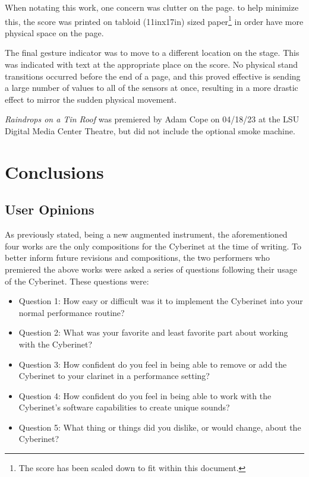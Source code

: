 When notating this work, one concern was clutter on the page. to help minimize this, the score was printed on tabloid (11inx17in) sized paper\footnote{The score has been scaled down to fit within this document.} in order have more physical space on the page. 


The final gesture indicator was to move to a different location on the stage. This was indicated with text at the appropriate place on the score. No physical stand transitions occurred before the end of a page, and this proved effective is sending a large number of values to all of the sensors at once, resulting in a more drastic effect to mirror the sudden physical movement.

\textit{Raindrops on a Tin Roof} was premiered by Adam Cope on 04/18/23 at the LSU Digital Media Center Theatre, but did not include the optional smoke machine.



\chapter{Conclusions} %

\section{User Opinions}

As previously stated, being a new augmented instrument, the aforementioned four works are the only compositions for the Cyberinet at the time of writing. To better inform future revisions and compositions, the two performers who premiered the above works were asked a series of questions following their usage of the Cyberinet. These questions were:

\begin{itemize}
    \item Question 1: How easy or difficult was it to implement the Cyberinet into your normal performance routine?
    \item Question 2: What was your favorite and least favorite part about working with the Cyberinet? 
    \item Question 3: How confident do you feel in being able to remove or add the Cyberinet to your clarinet in a performance setting?
    \item Question 4: How confident do you feel in being able to work with the Cyberinet's software capabilities to create unique sounds?
    \item Question 5: What thing or things did you dislike, or would change, about the Cyberinet?
\end{itemize}

